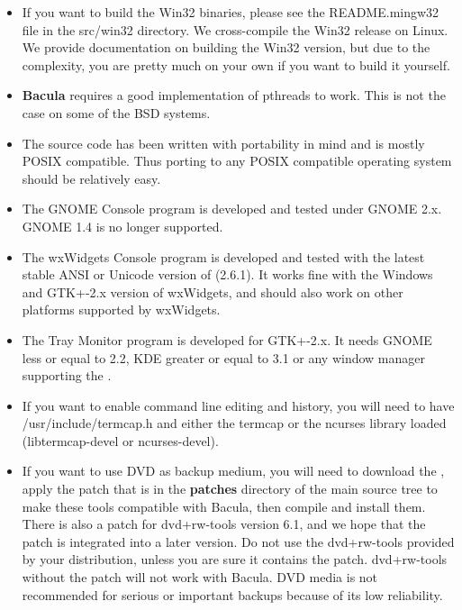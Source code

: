 \begin{itemize}
\item If you want to build the Win32 binaries, please see the
   README.mingw32 file in the src/win32 directory. We cross-compile the
   Win32 release on Linux. We provide documentation on building the Win32
   version, but due to the complexity, you are pretty much on your own
   if you want to build it yourself.
\item {\bf Bacula} requires a good implementation of pthreads to work.  This
   is not the case on some of the BSD systems. 
\item The source code has been written with portability in mind and is  mostly
   POSIX compatible. Thus porting to any POSIX compatible  operating system
   should be relatively easy. 
\item The GNOME Console program is developed and tested under GNOME 2.x.
   GNOME 1.4 is no longer supported.
\item The wxWidgets Console program is developed and tested with the latest 
   stable ANSI or Unicode version of 
    (2.6.1).  It works fine with the
   Windows and GTK+-2.x version of wxWidgets, and should  also work on other
   platforms supported by wxWidgets. 
\item The Tray Monitor program is developed for GTK+-2.x. It needs  GNOME less
   or equal to 2.2, KDE greater or equal to 3.1 or any window manager supporting
   the  
   . 
\item If you want to enable command line editing and history, you will  need
   to have /usr/include/termcap.h and either the termcap or the  ncurses library
   loaded (libtermcap-devel or ncurses-devel). 
\item If you want to use DVD as backup medium, you will need to download the
   ,
   apply the patch that is in the {\bf patches} directory of the main
   source tree
   to make these tools compatible with Bacula, then compile and install them.
   There is also a patch for dvd+rw-tools version 6.1, and we hope that the
   patch is integrated into a later version.
   Do not use the dvd+rw-tools provided by your distribution, unless you
   are sure it contains the patch. dvd+rw-tools without the patch will not
   work with Bacula. DVD media is not recommended for serious or important
   backups because of its low reliability.
\end{itemize}
